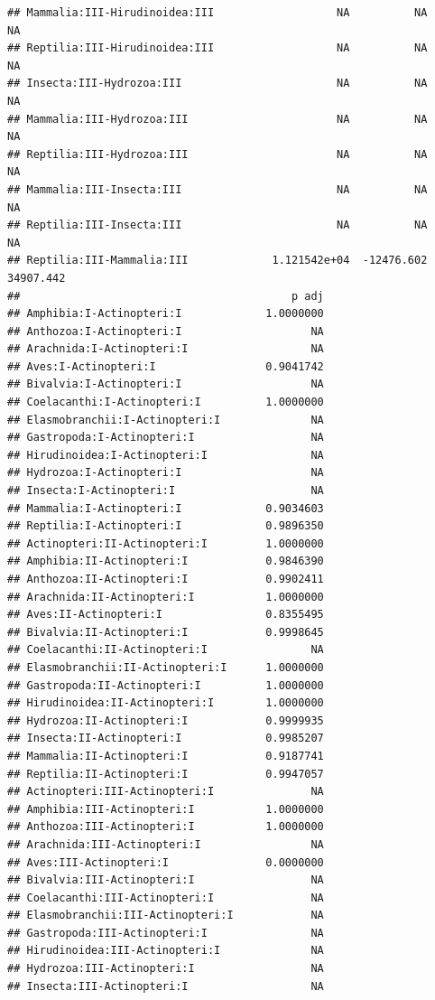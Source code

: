 \documentclass[
  12pt,
]{article}
\begin{document}
\begin{verbatim}
## Mammalia:III-Hirudinoidea:III                   NA          NA          NA
## Reptilia:III-Hirudinoidea:III                   NA          NA          NA
## Insecta:III-Hydrozoa:III                        NA          NA          NA
## Mammalia:III-Hydrozoa:III                       NA          NA          NA
## Reptilia:III-Hydrozoa:III                       NA          NA          NA
## Mammalia:III-Insecta:III                        NA          NA          NA
## Reptilia:III-Insecta:III                        NA          NA          NA
## Reptilia:III-Mammalia:III             1.121542e+04  -12476.602   34907.442
##                                          p adj
## Amphibia:I-Actinopteri:I             1.0000000
## Anthozoa:I-Actinopteri:I                    NA
## Arachnida:I-Actinopteri:I                   NA
## Aves:I-Actinopteri:I                 0.9041742
## Bivalvia:I-Actinopteri:I                    NA
## Coelacanthi:I-Actinopteri:I          1.0000000
## Elasmobranchii:I-Actinopteri:I              NA
## Gastropoda:I-Actinopteri:I                  NA
## Hirudinoidea:I-Actinopteri:I                NA
## Hydrozoa:I-Actinopteri:I                    NA
## Insecta:I-Actinopteri:I                     NA
## Mammalia:I-Actinopteri:I             0.9034603
## Reptilia:I-Actinopteri:I             0.9896350
## Actinopteri:II-Actinopteri:I         1.0000000
## Amphibia:II-Actinopteri:I            0.9846390
## Anthozoa:II-Actinopteri:I            0.9902411
## Arachnida:II-Actinopteri:I           1.0000000
## Aves:II-Actinopteri:I                0.8355495
## Bivalvia:II-Actinopteri:I            0.9998645
## Coelacanthi:II-Actinopteri:I                NA
## Elasmobranchii:II-Actinopteri:I      1.0000000
## Gastropoda:II-Actinopteri:I          1.0000000
## Hirudinoidea:II-Actinopteri:I        1.0000000
## Hydrozoa:II-Actinopteri:I            0.9999935
## Insecta:II-Actinopteri:I             0.9985207
## Mammalia:II-Actinopteri:I            0.9187741
## Reptilia:II-Actinopteri:I            0.9947057
## Actinopteri:III-Actinopteri:I               NA
## Amphibia:III-Actinopteri:I           1.0000000
## Anthozoa:III-Actinopteri:I           1.0000000
## Arachnida:III-Actinopteri:I                 NA
## Aves:III-Actinopteri:I               0.0000000
## Bivalvia:III-Actinopteri:I                  NA
## Coelacanthi:III-Actinopteri:I               NA
## Elasmobranchii:III-Actinopteri:I            NA
## Gastropoda:III-Actinopteri:I                NA
## Hirudinoidea:III-Actinopteri:I              NA
## Hydrozoa:III-Actinopteri:I                  NA
## Insecta:III-Actinopteri:I                   NA

\end{verbatim}
\end{document}
